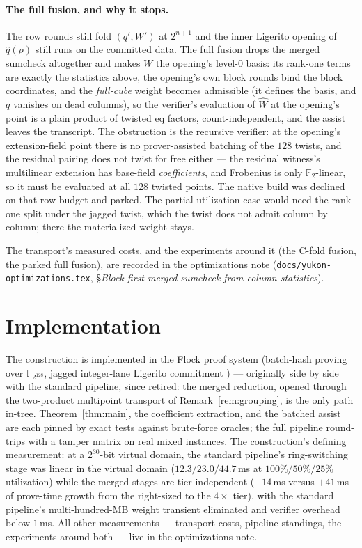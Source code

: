 \documentclass[11pt]{article}
\newcommand{\F}{\mathbb{F}}
\begin{document}
\paragraph{The full fusion, and why it stops.} The row rounds still
fold $(q', W')$ at $2^{n+1}$ and the inner Ligerito opening of
$\hat q(\rho)$ still runs on the committed data. The full fusion
drops the merged sumcheck altogether and makes $W$ the opening's
level-0 basis: its rank-one terms are exactly the statistics above,
the opening's own block rounds bind the block coordinates, and the
\emph{full-cube} weight becomes admissible (it defines the basis, and
$q$ vanishes on dead columns), so the verifier's evaluation of
$\widehat W$ at the opening's point is a plain product of twisted eq
factors, count-independent, and the assist leaves the transcript.
The obstruction is the recursive verifier: at the opening's
extension-field point there is no prover-assisted batching of the
$128$ twists, and the residual pairing does not twist for free either
--- the residual witness's multilinear extension has base-field
\emph{coefficients}, and Frobenius is only $\F_2$-linear, so it must
be evaluated at all $128$ twisted points. The native build was
declined on that row budget and parked. The partial-utilization case
would need the rank-one split under the jagged twist, which the twist
does not admit column by column; there the materialized weight stays.

The transport's measured costs, and the experiments around it (the
C-fold fusion, the parked full fusion), are recorded in the
optimizations note (\texttt{docs/yukon-optimizations.tex},
\S\emph{Block-first merged sumcheck from column statistics}).

\section{Implementation}\label{sec:eval}

The construction is implemented in the Flock proof system (batch-hash
proving over $\F_{2^{128}}$, jagged integer-lane Ligerito commitment
\cite{ligero,ligerito}) --- originally side by side with the standard
pipeline, since retired: the merged reduction, opened through the
two-product multipoint transport of Remark~\ref{rem:grouping}, is the
only path in-tree. Theorem~\ref{thm:main}, the coefficient
extraction, and the batched assist are each pinned by exact tests
against brute-force oracles; the full pipeline round-trips with a
tamper matrix on real mixed instances. The construction's defining
measurement: at a $2^{30}$-bit virtual domain, the standard
pipeline's ring-switching stage was linear in the virtual domain
($12.3 / 23.0 / 44.7$\,ms at $100\%/50\%/25\%$ utilization) while the
merged stages are tier-independent ($+14$\,ms versus $+41$\,ms of
prove-time growth from the right-sized to the $4\times$ tier), with
the standard pipeline's multi-hundred-MB weight transient eliminated
and verifier overhead below $1$\,ms. All other measurements ---
transport costs, pipeline standings, the experiments around both ---
live in the optimizations note.
\end{document}
